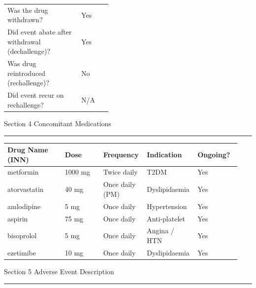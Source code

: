 \documentclass[11pt,a4paper]{scrartcl}
\newcommand{\sectionrule}{%
  \vspace{1pt}%
  {\color{WarmGold}\rule{\linewidth}{1.5pt}}%
  \vspace{4pt}%
}
\begin{document}
\vspace{4mm}

\begin{tabular}{@{}L{0.30\linewidth}C{0.12\linewidth}@{}}
\toprule
{}
 \\
\midrule
Was the drug withdrawn? & Yes \\
Did event abate after withdrawal (dechallenge)? & Yes \\
Was drug reintroduced (rechallenge)? & No \\
Did event recur on rechallenge? & N/A \\
\bottomrule
\end{tabular}

\vspace{6mm}

\begin{sectionbox}{\faPills\quad Section 4 \textbar{} Concomitant Medications}
\end{sectionbox}
\sectionrule

\begin{tabular}{@{}L{0.24\linewidth}L{0.16\linewidth}L{0.18\linewidth}L{0.18\linewidth}L{0.18\linewidth}@{}}
\toprule
{}
\small\bfseries Drug Name (INN) & \small\bfseries Dose & \small\bfseries Frequency & \small\bfseries Indication & \small\bfseries Ongoing? \\
\midrule
metformin & 1000 mg & Twice daily & T2DM & Yes \\
atorvastatin & 40 mg & Once daily (PM) & Dyslipidaemia & Yes \\
amlodipine & 5 mg & Once daily & Hypertension & Yes \\
aspirin & 75 mg & Once daily & Anti-platelet & Yes \\
bisoprolol & 5 mg & Once daily & Angina / HTN & Yes \\
ezetimibe & 10 mg & Once daily & Dyslipidaemia & Yes \\
\bottomrule
\end{tabular}

\vspace{6mm}

\begin{sectionbox}{\faExclamationTriangle\quad Section 5 \textbar{} Adverse Event Description}
\end{sectionbox}
\sectionrule
\end{document}
